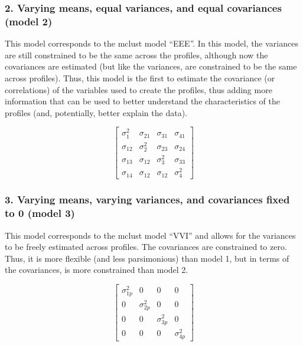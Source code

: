 \documentclass[]{msu-thesis}
\theoremstyle{definition}
\theoremstyle{definition}
\theoremstyle{definition}
\theoremstyle{remark}
\begin{document}
\subsubsection{2. Varying means, equal variances, and equal covariances
(model
2)}\label{varying-means-equal-variances-and-equal-covariances-model-2}

This model corresponds to the mclust model ``EEE''. In this model, the
variances are still constrained to be the same across the profiles,
although now the covariances are estimated (but like the variances, are
constrained to be the same across profiles). Thus, this model is the
first to estimate the covariance (or correlations) of the variables used
to create the profiles, thus adding more information that can be used to
better understand the characteristics of the profiles (and, potentially,
better explain the data).

\[
\left[ \begin{matrix} { \sigma  }_{ 1 }^{ 2 } & { \sigma  }_{ 21 } & { \sigma  }_{ 31 } & { \sigma  }_{ 41 } \\ { \sigma  }_{ 12 } & { \sigma  }_{ 2 }^{ 2 } & { \sigma  }_{ 23 } & { \sigma  }_{ 24 } \\ { \sigma  }_{ 13 } & { \sigma  }_{ 12 } & { \sigma  }_{ 3 }^{ 2 } & { \sigma  }_{ 33 } \\ { \sigma  }_{ 14 } & { \sigma  }_{ 12 } & { \sigma  }_{ 12 } & { \sigma  }_{ 4 }^{ 2 } \end{matrix} \right] 
\]

\subsubsection{3. Varying means, varying variances, and covariances
fixed to 0 (model
3)}\label{varying-means-varying-variances-and-covariances-fixed-to-0-model-3}

This model corresponds to the mclust model ``VVI'' and allows for the
variances to be freely estimated across profiles. The covariances are
constrained to zero. Thus, it is more flexible (and less parsimonious)
than model 1, but in terms of the covariances, is more constrained than
model 2.

\[ 
\left[ \begin{matrix} { \sigma  }_{ 1p }^{ 2 } & 0 & 0 & 0 \\ 0 & { \sigma  }_{ 2p }^{ 2 } & 0 & 0 \\ 0 & 0 & { \sigma  }_{ 3p }^{ 2 } & 0 \\ 0 & 0 & 0 & { \sigma  }_{ 4p }^{ 2 } \end{matrix} \right] 
\]
\end{document}
